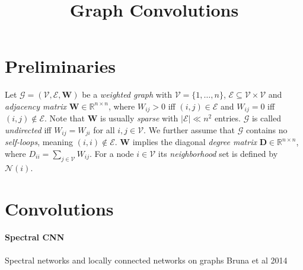 \documentclass[pdftex,10pt,a4paper]{scrartcl}
\title{Graph Convolutions}
\date{\vspace{-5ex}}
\begin{document}
\maketitle

\section{Preliminaries}

Let $\mathcal{G} = (\mathcal{V}, \mathcal{E}, \mathbf{W})$ be a \emph{weighted graph} with $\mathcal{V} = \{1, \ldots, n\}$, $\mathcal{E} \subseteq \mathcal{V} \times \mathcal{V}$ and \emph{adjacency matrix} $\mathbf{W} \in \mathbb{R}^{n \times n}$, where $W_{ij} > 0$ iff $(i, j) \in \mathcal{E}$ and $W_{ij} = 0$ iff $(i, j) \not\in \mathcal{E}$.
Note that $\mathbf{W}$ is usually \emph{sparse} with $|\mathcal{E}| \ll n^2$ entries.
$\mathcal{G}$ is called \emph{undirected} iff $W_{ij} = W_{ji}$ for all $i,j \in \mathcal{V}$.
We further assume that $\mathcal{G}$ contains no \emph{self-loops}, meaning $(i, i) \not\in \mathcal{E}$.
$\mathbf{W}$ implies the diagonal \emph{degree matrix} $\mathbf{D} \in \mathbb{R}^{n \times n}$, where $D_{ii} = \sum_{j \in \mathcal{V}} W_{ij}$.
For a node $i \in \mathcal{V}$ its \emph{neighborhood} set is defined by $\mathcal{N}(i)$.





\section{Convolutions}

\paragraph{Spectral CNN}


Spectral networks and locally connected networks on graphs
Bruna et al 2014
\end{document}
